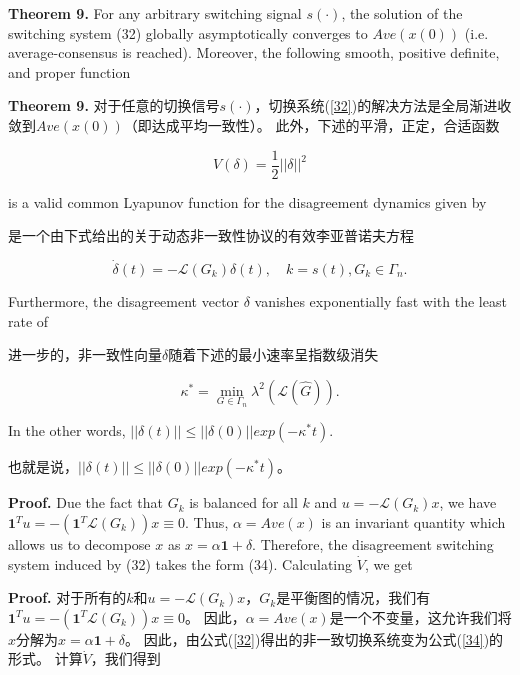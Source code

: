 \documentclass{article}
\begin{document}
{\color[gray]{0.5}
\noindent \textbf{Theorem 9.} For any arbitrary switching signal $s(\cdot)$, the solution of the switching system (32) globally asymptotically converges to $Ave(x(0))$ (i.e. average-consensus is reached). 
Moreover, the following smooth, positive deﬁnite, and proper function
}

\noindent \textbf{Theorem 9.} 对于任意的切换信号$s(\cdot)$，切换系统(\ref{32})的解决方法是全局渐进收敛到$Ave(x(0))$（即达成平均一致性）。
此外，下述的平滑，正定，合适函数

\begin{equation}
    V(\delta) = \frac{1}{2}||\delta||^2
    \label{33}
    \tag{33}
\end{equation}

{\color[gray]{0.5}
\noindent is a valid common Lyapunov function for the disagreement dynamics given by
}

\noindent 是一个由下式给出的关于动态非一致性协议的有效李亚普诺夫方程

\begin{equation}
    \dot{\delta}(t) = -\mathcal{L}(G_k)\delta(t),\quad k=s(t),G_k\in \Gamma_n.
    \tag{34}
    \label{34}
\end{equation}

{\color[gray]{0.5}
\noindent Furthermore, the disagreement vector $\delta$ vanishes exponentially fast with the least rate of
}

\noindent 进一步的，非一致性向量$\delta$随着下述的最小速率呈指数级消失

\begin{equation}
    \kappa^* = \min_{G\in \Gamma_n} \lambda^2(\mathcal{L}(\hat{G})).
    \tag{35}
    \label{35}
\end{equation}

{\color[gray]{0.5}
\noindent In the other words, $||\delta(t)||\le ||\delta(0)||exp(-\kappa^*t)$.
}

\noindent 也就是说，$||\delta(t)||\le ||\delta(0)||exp(-\kappa^*t)$。

{\color[gray]{0.5}
\noindent \textbf{Proof.} Due the fact that $G_k$ is balanced for all $k$ and $u=-\mathcal{L}(G_k)x$, we have $\mathbf{1}^Tu=-(\mathbf{1}^T\mathcal{L}(G_k))x\equiv0$. 
Thus, $\alpha=Ave(x)$ is an invariant quantity which allows us to decompose $x$ as $x=\alpha \mathbf{1}+\delta$.
Therefore, the disagreement switching system induced by (32) takes the form (34). 
Calculating $\dot{V}$, we get
}

\noindent \textbf{Proof.}
对于所有的$k$和$u=-\mathcal{L}(G_k)x$，$G_k$是平衡图的情况，我们有$\mathbf{1}^Tu=-(\mathbf{1}^T\mathcal{L}(G_k))x\equiv0$。
因此，$\alpha=Ave(x)$是一个不变量，这允许我们将$x$分解为$x=\alpha \mathbf{1}+\delta$。
因此，由公式(\ref{32})得出的非一致切换系统变为公式(\ref{34})的形式。
计算$\dot{V}$，我们得到
\end{document}
